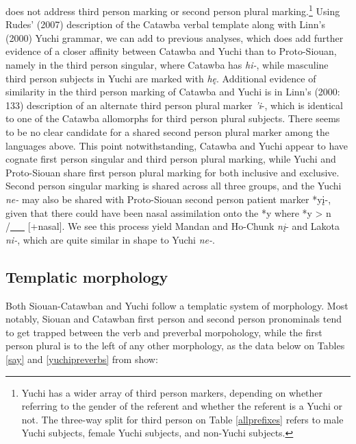 \documentclass[output=paper]{LSP/langsci}
\begin{document}
{\citet{Rankin1998} does not address third person marking or second person plural marking.\footnote{Yuchi has a wider array of third person markers, depending on whether referring to the gender of the referent and whether the referent is a Yuchi or not. The three-way split for third person on Table \ref{allprefixes} refers to male Yuchi subjects, female Yuchi subjects, and non-Yuchi subjects.} Using Rudes' (2007) description of the Catawba verbal template along with Linn's (2000) Yuchi grammar, we can add to previous analyses, which does add further evidence of a closer affinity between Catawba and Yuchi than to Proto-Siouan, namely in the third person singular, where Catawba has \emph{hi-}, while masculine third person subjects in Yuchi are marked with \emph{h\k{e}}. Additional evidence of similarity in the third person marking of Catawba and Yuchi is in Linn's (2000: 133) description of an alternate third person plural marker \emph{'i}-, which is identical to one of the Catawba allomorphs for third person plural subjects. There seems to be no clear candidate for a shared second person plural marker among the languages above. This point notwithstanding, Catawba and Yuchi appear to have cognate first person singular and third person plural marking, while Yuchi and Proto-Siouan share first person plural marking for both inclusive and exclusive. Second person singular marking is shared across all three groups, and the Yuchi \emph{ne-} may also be shared with Proto-Siouan second person patient marker *y\k{i}-, given that there could have been nasal assimilation onto the *y where *y > n /\underline{~~~} [+nasal]. We see this process yield Mandan and Ho-Chunk \emph{n\k{i}}- and Lakota \emph{ni-}, which are quite similar in shape to Yuchi \emph{ne-}.

\subsection{Templatic morphology}

Both Siouan-Catawban and Yuchi follow a templatic system of morphology. Most notably, Siouan and Catawban first person and second person pronominals tend to get trapped between the verb and preverbal morpohology, while the first person plural is to the left of any other morphology, as the data below on Tables \ref{say} and \ref{yuchipreverbs} from \citet{Rankin1998} show:

}
\end{document}
